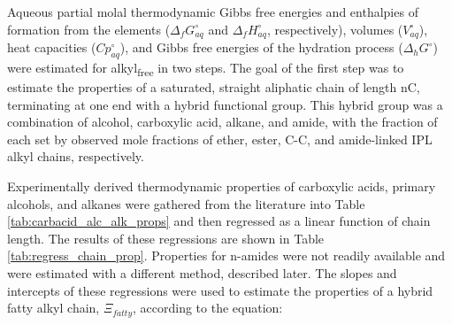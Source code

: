 Aqueous partial molal thermodynamic Gibbs free energies and enthalpies of formation from the elements ($\Delta_{f}G_{aq}^{\circ}$ and $\Delta_{f}H_{aq}^{\circ}$, respectively), volumes ($V_{aq}^{\circ}$), heat capacities ($Cp_{aq}^{\circ}$), and Gibbs free energies of the hydration process ($\Delta_{h}G^{\circ}$) were estimated for alkyl\textsubscript{free} in two steps. The goal of the first step was to estimate the properties of a saturated, straight aliphatic chain of length nC, terminating at one end with a hybrid functional group. This hybrid group was a combination of alcohol, carboxylic acid, alkane, and amide, with the fraction of each set by observed mole fractions of ether, ester, C-C, and amide-linked IPL alkyl chains, respectively. 

Experimentally derived thermodynamic properties of carboxylic acids, primary alcohols, and alkanes were gathered from the literature into Table \ref{tab:carbacid_alc_alk_props} and then regressed as a linear function of chain length. The results of these regressions are shown in Table \ref{tab:regress_chain_prop}. Properties for n-amides were not readily available and were estimated with a different method, described later.
The slopes and intercepts of these regressions were used to estimate the properties of a hybrid fatty alkyl chain, $\Xi_{fatty}$, according to the equation:

